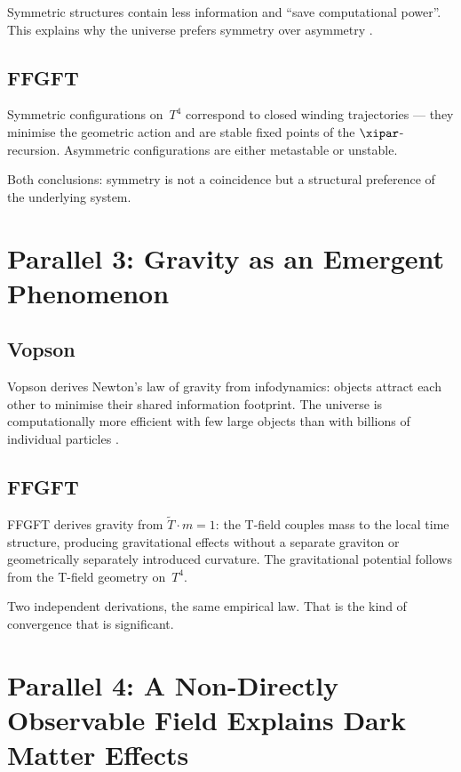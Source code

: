 Symmetric structures contain less information and ``save computational power''.
This explains why the universe prefers symmetry over asymmetry \cite{Vopson2024}.

\subsection{FFGFT}

Symmetric configurations on~$T^4$ correspond to closed winding trajectories ---
they minimise the geometric action and are stable fixed points of the
$\xipar$-recursion. Asymmetric configurations are either metastable or unstable.

Both conclusions: symmetry is not a coincidence but a structural preference of
the underlying system.

\section{Parallel 3: Gravity as an Emergent Phenomenon}

\subsection{Vopson}

Vopson derives Newton's law of gravity from infodynamics: objects attract each
other to minimise their shared information footprint. The universe is
computationally more efficient with few large objects than with billions of
individual particles \cite{Vopson2022}.

\subsection{FFGFT}

FFGFT derives gravity from $\tilde{T} \cdot m = 1$: the T-field couples mass
to the local time structure, producing gravitational effects without a separate
graviton or geometrically separately introduced curvature. The gravitational
potential follows from the T-field geometry on~$T^4$.

Two independent derivations, the same empirical law. That is the kind of
convergence that is significant.

\section{Parallel 4: A Non-Directly Observable Field Explains Dark Matter Effects}


